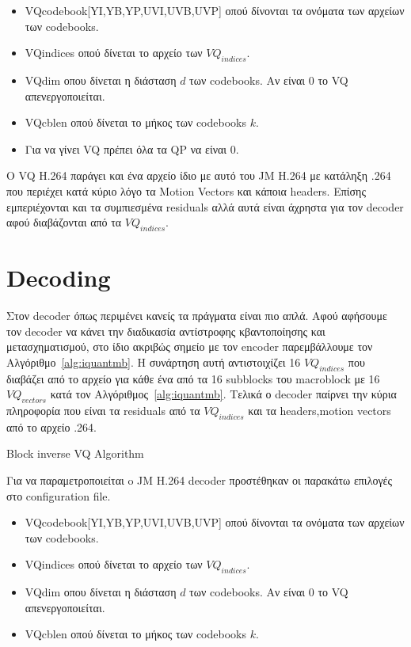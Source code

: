 \begin{itemize}
    \item VQcodebook[YI,YB,YP,UVI,UVB,UVP] οπού δίνονται τα ονόματα των αρχείων των codebooks.
    \item VQindices οπού δίνεται το αρχείο των $VQ_{indices}$.
    \item VQdim οπου δίνεται η διάσταση $d$ των codebooks. Αν είναι 0 το VQ απενεργοποιείται.
    \item VQcblen οπού δίνεται το μήκος των codebooks $k$.
    \item Για να γίνει VQ πρέπει όλα τα QP να είναι 0.
\end{itemize}

\indent Ο VQ H.264 παράγει και ένα αρχείο ίδιο με αυτό του JM H.264 με κατάληξη .264 που περιέχει κατά κύριο λόγο τα Motion Vectors και κάποια headers. Επίσης εμπεριέχονται και τα συμπιεσμένα residuals αλλά αυτά είναι άχρηστα για τον decoder αφού διαβάζονται από τα $VQ_{indices}$.

\section{Decoding}
\label{section:sect53}

\indent Στον decoder όπως περιμένει κανείς τα πράγματα είναι πιο απλά. Αφού αφήσουμε τον decoder να κάνει την διαδικασία αντίστροφης κβαντοποίησης και μετασχηματισμού, στο ίδιο ακριβώς σημείο με τον encoder παρεμβάλλουμε τον Αλγόριθμο~\ref{alg:iquantmb}. Η συνάρτηση αυτή αντιστοιχίζει 16 $VQ_{indices}$ που διαβάζει από το αρχείο για κάθε ένα από τα 16 subblocks του macroblock με 16 $VQ_{vectors}$ κατά τον Αλγόριθμος~\ref{alg:iquantmb}. Τελικά ο decoder παίρνει την κύρια πληροφορία που είναι τα residuals από τα $VQ_{indices}$ και τα headers,motion vectors από το αρχείο .264.

\begin{algorithm}[h]
\begin{algorithmic}[1]
\EndFor
\EndFunction
\end{algorithmic}
\caption{Block inverse VQ Algorithm}
\label{alg:iquantmb}
\end{algorithm}

\indent Για να παραμετροποιείται o JM Η.264 decoder προστέθηκαν οι παρακάτω επιλογές στο configuration file.

\begin{itemize}
    \item VQcodebook[YI,YB,YP,UVI,UVB,UVP] οπού δίνονται τα ονόματα των αρχείων των codebooks.
    \item VQindices οπού δίνεται το αρχείο των $VQ_{indices}$.
    \item VQdim οπου δίνεται η διάσταση $d$ των codebooks. Αν είναι 0 το VQ απενεργοποιείται.
    \item VQcblen οπού δίνεται το μήκος των codebooks $k$.
\end{itemize}